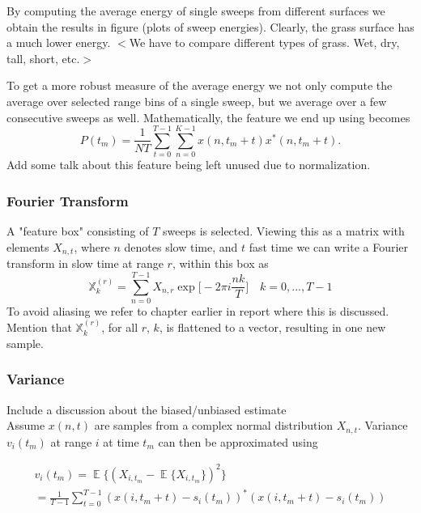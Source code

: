 \documentclass[a4paper, 12pt]{article}
\DeclareMathOperator*{\E}{\mathbb{E}}
\begin{document}
By computing the average energy of single sweeps from different surfaces we obtain the results in figure (plots of sweep energies). Clearly, the grass surface has a much lower energy. $<$We have to compare different types of grass. Wet, dry, tall, short, etc.$>$

To get a more robust measure of the average energy we not only compute the average over selected range bins of a single sweep, but we average over a few consecutive sweeps as well. Mathematically, the feature we end up using becomes
\begin{equation}
	P(t_m) = \frac{1}{NT}\sum_{t=0}^{T-1}\sum_{n=0}^{K-1}x(n, t_m + t)x^*(n, t_m + t).
\end{equation}
Add some talk about this feature being left unused due to normalization.



\subsubsection{Fourier Transform}
A "feature box" consisting of $T$ sweeps is selected. Viewing this as a matrix with elements $X_{n,t}$, where $n$ denotes slow time, and $t$ fast time we can write a Fourier transform in slow time at range $r$, within this box as
\begin{equation}
	\mathbb{X}_k^{(r)} = \sum_{n=0}^{T-1}X_{n,r}\exp\Big[-2\pi i\frac{nk}{T}\Big] \quad k=0, ..., T-1
\end{equation}
To avoid aliasing we refer to chapter earlier in report where this is discussed. Mention that $\mathbb{X}_k^{(r)}$, for all $r$, $k$, is flattened to a vector, resulting in one new sample.




\subsubsection{Variance}

Include a discussion about the biased/unbiased estimate \\

Assume $x(n,t)$ are samples from a complex normal distribution $X_{n,t}$. Variance $v_i(t_m)$ at range $i$ at time $t_m$ can then be approximated using

\begin{equation}
\label{eq:var}
\begin{gathered}
	v_i(t_m) = \E\{ (X_{i,t_m} - \E\{X_{i,t_m}\})^2\} \\
	= \frac{1}{T-1}\sum_{t=0}^{T-1}(x(i, t_m + t) - s_i(t_m))^*(x(i, t_m + t) -  s_i(t_m))
\end{gathered}
\end{equation}
\end{document}
